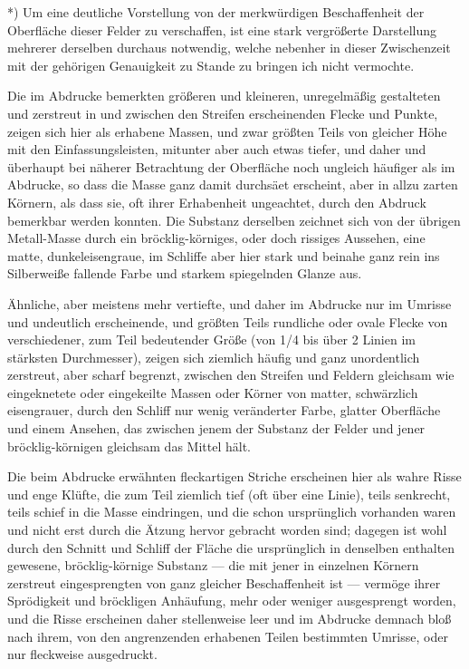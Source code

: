 \documentclass[a4paper, 11pt, oneside, german]{article}
\begin{document}
*) Um eine deutliche Vorstellung von der merkwürdigen Beschaffenheit der Oberfläche dieser Felder zu verschaffen, ist eine stark vergrößerte Darstellung mehrerer derselben durchaus notwendig, welche nebenher in dieser Zwischenzeit mit der gehörigen Genauigkeit zu Stande zu bringen ich nicht vermochte.

Die im Abdrucke bemerkten größeren und kleineren, unregelmäßig gestalteten und zerstreut in und zwischen den Streifen erscheinenden Flecke und Punkte, zeigen sich hier als erhabene Massen, und zwar größten Teils von gleicher Höhe mit den Einfassungsleisten, mitunter aber auch etwas tiefer, und daher und überhaupt bei näherer Betrachtung der Oberfläche noch ungleich häufiger als im Abdrucke, so dass die Masse ganz damit durchsäet erscheint, aber in allzu zarten Körnern, als dass sie, oft ihrer Erhabenheit ungeachtet, durch den Abdruck bemerkbar werden konnten. Die Substanz derselben zeichnet sich von der übrigen Metall-Masse durch ein bröcklig-körniges, oder doch rissiges Aussehen, eine matte, dunkeleisengraue, im Schliffe aber hier stark und beinahe ganz rein ins Silberweiße fallende Farbe und starkem spiegelnden Glanze aus.

Ähnliche, aber meistens mehr vertiefte, und daher im Abdrucke nur im Umrisse und undeutlich erscheinende, und größten Teils rundliche oder ovale Flecke von verschiedener, zum Teil bedeutender Größe (von 1/4 bis über 2 Linien im stärksten Durchmesser), zeigen sich ziemlich häufig und ganz unordentlich zerstreut, aber scharf begrenzt, zwischen den Streifen und Feldern gleichsam wie eingeknetete oder eingekeilte Massen oder Körner von matter, schwärzlich eisengrauer, durch den Schliff nur wenig veränderter Farbe, glatter Oberfläche und einem Ansehen, das zwischen jenem der Substanz der Felder und jener bröcklig-körnigen gleichsam das Mittel hält.

Die beim Abdrucke erwähnten fleckartigen Striche erscheinen hier als wahre Risse und enge Klüfte, die zum Teil ziemlich tief (oft über eine Linie), teils senkrecht, teils schief in die Masse eindringen, und die schon ursprünglich vorhanden waren und nicht erst durch die Ätzung hervor gebracht worden sind; dagegen ist wohl durch den Schnitt und Schliff der Fläche die ursprünglich in denselben enthalten gewesene, bröcklig-körnige Substanz --- die mit jener in einzelnen Körnern zerstreut eingesprengten von ganz gleicher Beschaffenheit ist --- vermöge ihrer Sprödigkeit und bröckligen Anhäufung, mehr oder weniger ausgesprengt worden, und die Risse erscheinen daher stellenweise leer und im Abdrucke demnach bloß nach ihrem, von den angrenzenden erhabenen Teilen bestimmten Umrisse, oder nur fleckweise ausgedruckt.
\end{document}
